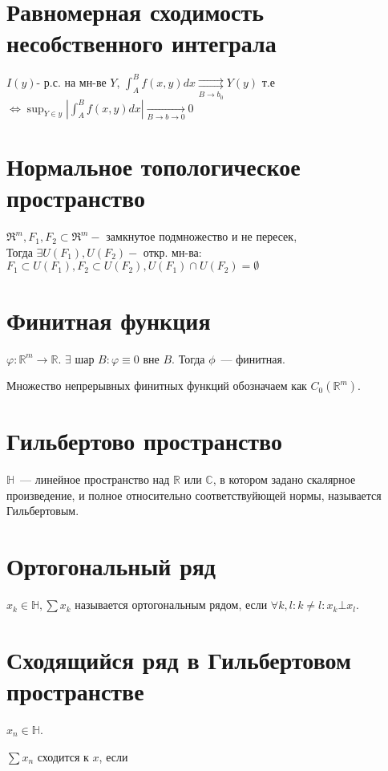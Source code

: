     \section{Равномерная сходимость несобственного интеграла}
    $I(y)$- р.с. на мн-ве $Y$, $\int_A^B f(x,y) dx \underset{B \to b_0}{\rightrightarrows}  Y(y)$ т.е \newline $\Leftrightarrow \sup_{Y \in y} |\int_A^B f(x,y) dx| \underset{B \rightarrow b \to 0}{\rightarrow} 0$

    \section{Нормальное топологическое пространство}
    $\Re^m, F_1,F_2 \subset \Re^m -$ замкнутое подмножество и не пересек, \\
    Тогда  $\exists U(F_1), U(F_2) -$ откр. мн-ва: $F_1 \subset U(F_1), F_2 \subset U(F_2), U(F_1) \cap U(F_2) = \emptyset$

    \section{Финитная функция}
    $\varphi : \mathbb{R}^m \rightarrow \mathbb{R}$. $\exists$ шар $B: \varphi \equiv 0 $ вне $B$. Тогда $\phi$~--- финитная.

    Множество непрерывных финитных функций обозначаем как $C_0(\mathbb{R}^m)$.

	\section{Гильбертово пространство}
	$\mathds{H}$~--- линейное пространство над $\mathds{R}$ или $\mathds{C}$, в котором задано скалярное произведение, и полное относительно соответствуйющей нормы, называется Гильбертовым.

	\section{Ортогональный ряд}
	$x_k \in \mathds{H}, \sum x_k$ называется ортогональным рядом, если $\forall k, l: k \neq l: x_k \bot x_l$.

	\section{Сходящийся ряд в Гильбертовом пространстве}
	$x_n \in \mathds{H}$.

	$\sum x_n$ сходится к $x$, если

